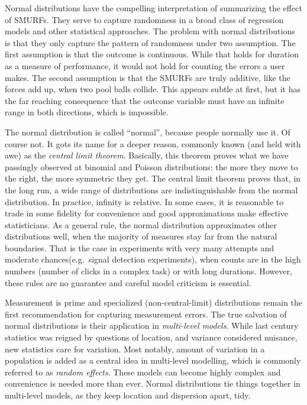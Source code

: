 \documentclass[]{svmono}
\begin{document}
Normal distributions have the compelling interpretation of summarizing
the effect of SMURFs. They serve to capture randomness in a broad class
of regression models and other statistical approaches. The problem with
normal distributions is that they only capture the pattern of randomness
under two assumption. The first assumption is that the outcome is
continuous. While that holds for duration as a measure of performance,
it would not hold for counting the errors a user makes. The second
assumption is that the SMURFs are truly additive, like the forces add
up, when two pool balls collide. This appears subtle at first, but it
has the far reaching consequence that the outcome variable must have an
infinite range in both directions, which is impossible.

The normal distribution is called ``normal'', because people normally
use it. Of course not. It gots its name for a deeper reason, commonly
known (and held with awe) as the \emph{central limit theorem}.
Basically, this theorem proves what we have passingly observed at
binomial and Poisson distributions: the more they move to the right, the
more symmetric they get. The central limit theorem proves that, in the
long run, a wide range of distributions are indistinguishable from the
normal distribution. In practice, infinity is relative. In some cases,
it is reasonable to trade in some fidelity for convenience and good
approximations make effective statisticians. As a general rule, the
normal distribution approximates other distributions well, when the
majority of measures stay far from the natural boundaries. That is the
case in experiments with very many attempts and moderate
chances(e.g.~signal detection experiments), when counts are in the high
numbers (number of clicks in a complex task) or with long durations.
However, these rules are no guarantee and careful model criticism is
essential.

Measurement is prime and specialized (non-central-limit) distributions
remain the first recommendation for capturing measurement errors. The
true salvation of normal distributions is their application in
\emph{multi-level models}. While last century statistics was reigned by
questions of location, and variance considered nuisance, new statistics
care for variation. Most notably, amount of variation in a population is
added as a central idea in multi-level modelling, which is commonly
referred to as \emph{random effects}. These models can become highly
complex and convenience is needed more than ever. Normal distributions
tie things together in multi-level models, as they keep location and
dispersion apart, tidy.
\end{document}
